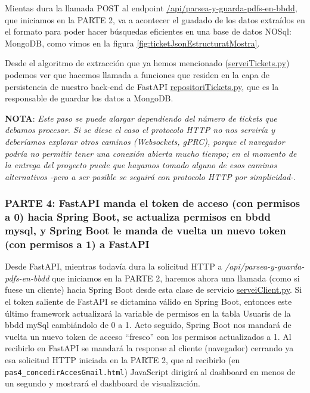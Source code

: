 \documentclass[a4paper,12pt]{report}
\begin{document}
		
		Mientas dura la llamada POST al endpoint \href{https://github.com/blackcub3s/mercApp/blob/f5413ed8cf7ed88c5ed18299564b836d27c52bd4/APP%20WEB/__FastAPI__/app/controlador.py#L132-L152}{/api/parsea-y-guarda-pdfs-en-bbdd}, que iniciamos en la PARTE 2, va a acontecer el guadado de los datos extraídos en el formato para poder hacer búsquedas eficientes en una base de datos NOSql: MongoDB, como vimos en la figura \ref{fig:ticketJsonEstructuratMostra}.
		
		Desde el algoritmo de extracción que ya hemos mencionado (\href{https://github.com/blackcub3s/mercApp/blob/main/APP%20WEB/__FastAPI__/app/serveiTickets.py}{serveiTickets.py}) podemos ver que hacemos llamada a funciones que residen en la capa de persistencia de nuestro back-end de FastAPI \href{https://github.com/blackcub3s/mercApp/blob/main/APP%20WEB/__FastAPI__/app/repositoriTickets.py}{repositoriTickets.py}, que es la responsable de guardar los datos a MongoDB.
		
		\textbf{NOTA}: \textit{Este paso se puede alargar dependiendo del número de tickets que debamos procesar. Si se diese el caso el protocolo HTTP no nos serviría y deberíamos explorar otros caminos (Websockets, gPRC), porque el navegador podría no permitir tener una conexión abierta mucho tiempo; en el momento de la entrega del proyecto puede que hayamos tomado alguno de esos caminos alternativos -pero a ser posible se seguirá con protocolo HTTP por simplicidad-.}
		
		
		
		
		
		
		
		
		
		
		\subsubsection{PARTE 4: FastAPI manda el token de acceso (con permisos a 0) hacia Spring Boot, se actualiza permisos en bbdd mysql, y Spring Boot le manda de vuelta un nuevo token (con permisos a 1) a FastAPI}
		\label{sec:PARTE4_FASTAPI}
		
		Desde FastAPI, mientras todavía dura la solicitud HTTP a \textit{/api/parsea-y-guarda-pdfs-en-bbdd} que iniciamos en la PARTE 2, haremos ahora una llamada (como si fuese un cliente) hacia Spring Boot desde esta clase de servicio \href{https://github.com/blackcub3s/mercApp/blob/main/APP%20WEB/__FastAPI__/app/serveiClient.py}{serveiClient.py}. Si el token saliente de FastAPI se dictamina válido en Spring Boot, entonces este último framework actualizará la variable de permisos en la tabla Usuaris de la bbdd mySql cambiándolo de 0 a 1. Acto seguido, Spring Boot nos mandará de vuelta un nuevo token de acceso ``fresco'' con los permisos actualizados a 1. Al recibirlo en FastAPI se mandará la response al cliente (navegador) cerrando ya esa solicitud HTTP iniciada en la PARTE 2, que al recibirlo  (en \texttt{pas4\_concedirAccesGmail.html}) JavaScript dirigirá al dashboard en menos de un segundo y mostrará el dashboard de visualización.
		
\end{document}

